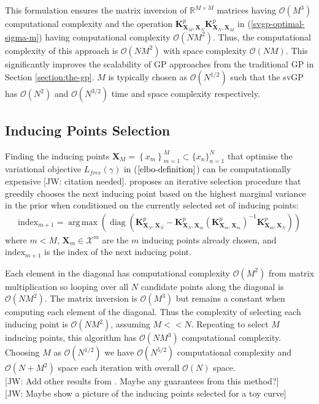 \documentclass{article}
\newcommand{\jw}[1]{{\color{gray} [JW: #1]}}
\newcommand{\diag}{\operatorname{diag}}
\DeclareMathOperator*{\argmax}{arg\,max}
\numberwithin{equation}{section}
\begin{document}
This formulation ensures the matrix inversion of $\mathbb{R}^{M \times M}$ matrices having $\mathcal{O}\left(M^3\right)$ computational complexity and the operation $\mathbf{K}^p_{\mathbf{X}_M, \mathbf{X}_N} \mathbf{K}^p_{\mathbf{X}_N, \mathbf{X}_M} $ in (\ref{svgp-optimal-sigma-m}) having computational complexity $\mathcal{O}\left(NM^2\right)$. Thus, the computational complexity of this approach is $\mathcal{O}\left(NM^2\right)$ with space complexity $\mathcal{O}\left(NM\right)$. This significantly improves the scalability of GP approaches from the traditional GP in Section \ref{section:the-gp}. $M$ is typically chosen as $\mathcal{O}(N^{1/2})$ such that the svGP has $\mathcal{O}(N^{2})$ and $\mathcal{O}(N^{3/2})$ time and space complexity respectively.

\subsection{Inducing Points Selection}
Finding the inducing points $\mathbf{X}_M = \left\{x_m\right\}_{m=1}^{M} \subset \{x_n\}_{n=1}^{N}$ that optimise the variational objective $L_{free}(\gamma)$ in ($\ref{elbo-definition}$) can be computationally expensive \jw{citation needed}. \cite{burt2020convergence} proposes an iterative selection procedure that greedily chooses the next inducing point based on the highest marginal variance in the prior when conditioned on the currently selected set of inducing points:
\begin{align}
    \text{index}_{m+1} = \argmax \left(\diag \left(\mathbf{K}^p_{\mathbf{X}_N, \mathbf{X}_N} - \mathbf{K}^p_{\mathbf{X}_N, \mathbf{X}_{m}} \left(\mathbf{K}^p_{\mathbf{X}_{m}, \mathbf{X}_{m}}\right)^{-1}\mathbf{K}^p_{\mathbf{X}_{m}, \mathbf{X}_N}\right)\right)
\end{align}
where $m < M$, $\mathbf{X}_{m} \in \mathcal{X}^m$ are the $m$ inducing points already chosen, and $\text{index}_{m+1}$ is the index of the next inducing point.

Each element in the diagonal has computational complexity $\mathcal{O}(M^2)$ from matrix multiplication so looping over all $N$ candidate points along the diagonal is $\mathcal{O}(NM^2)$. The matrix inversion is $\mathcal{O}(M^3)$ but remains a constant when computing each element of the diagonal. Thus the complexity of selecting each inducing point is $\mathcal{O}(NM^2)$, assuming $M << N$. Repeating to select $M$ inducing points, this algorithm has $\mathcal{O}(NM^3)$ computational complexity. Choosing $M$ as $\mathcal{O}(N^{1/2})$ we have $\mathcal{O}(N^{5/2})$ computational complexity and $\mathcal{O}(N + M^2)$ space each iteration with overall $\mathcal{O}(N)$ space.
\\\jw{Add other results from \cite{burt2020convergence}. Maybe any guarantees from this method?}
\\\jw{Maybe show a picture of the inducing points selected for a toy curve}
\end{document}
